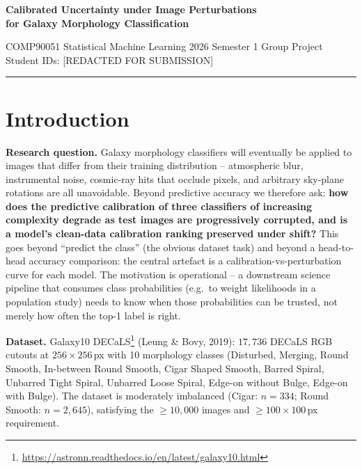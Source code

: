 \documentclass[10pt,a4paper]{article}
\begin{document}
\begingroup
\centering
{\Large\bfseries\color{accent} Calibrated Uncertainty under Image Perturbations\\for Galaxy Morphology Classification\par}
\vspace{3pt}
{\small COMP90051 Statistical Machine Learning \textbar{} 2026 Semester 1 Group Project}\\
{\small Student IDs: [REDACTED FOR SUBMISSION]}\par
\vspace{2pt}
{\color{accent}\rule{\linewidth}{0.6pt}}
\endgroup
\vspace{-4pt}

\section{Introduction}
\textbf{Research question.} Galaxy morphology classifiers will eventually be applied to images that differ from their training distribution -- atmospheric blur, instrumental noise, cosmic-ray hits that occlude pixels, and arbitrary sky-plane rotations are all unavoidable. Beyond predictive accuracy we therefore ask: \textbf{how does the predictive calibration of three classifiers of increasing complexity degrade as test images are progressively corrupted, and is a model's clean-data calibration ranking preserved under shift?} This goes beyond ``predict the class'' (the obvious dataset task) and beyond a head-to-head accuracy comparison: the central artefact is a calibration-vs-perturbation curve for each model. The motivation is operational -- a downstream science pipeline that consumes class probabilities (e.g.\ to weight likelihoods in a population study) needs to know when those probabilities can be trusted, not merely how often the top-1 label is right.

\textbf{Dataset.} Galaxy10 DECaLS\footnote{\url{https://astronn.readthedocs.io/en/latest/galaxy10.html}} (Leung \& Bovy, 2019): $17{,}736$ DECaLS RGB cutouts at $256\!\times\!256$\,px with 10 morphology classes (Disturbed, Merging, Round Smooth, In-between Round Smooth, Cigar Shaped Smooth, Barred Spiral, Unbarred Tight Spiral, Unbarred Loose Spiral, Edge-on without Bulge, Edge-on with Bulge). The dataset is moderately imbalanced (Cigar: $n{=}334$; Round Smooth: $n{=}2{,}645$), satisfying the $\geq\!10{,}000$ images and $\geq\!100{\times}100$\,px requirement.
\end{document}
